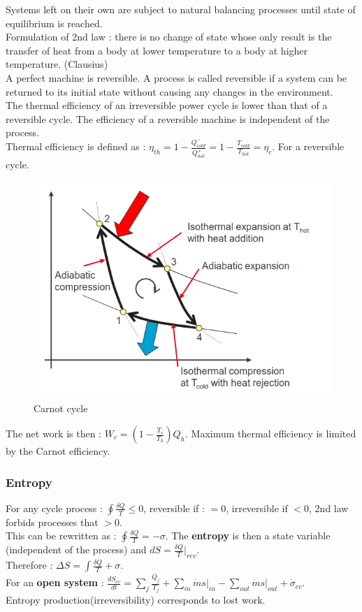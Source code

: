 \documentclass[../main.tex]{subfiles}
\begin{document}
Systems left on their own are subject to natural balancing processes until state of equilibrium is reached. \\
Formulation of 2nd law : there is no change of state whose only result is the transfer of heat from a body at lower temperature to a body at higher temperature. (Clausius)\\
A perfect machine is reversible. A process is called reversible if a system can be returned to its initial state without causing any changes in the environment. \\
\warning The thermal efficiency of an irreversible power cycle is lower than that of a reversible cycle. The efficiency of a reversible machine is independent of the process.\\

Thermal efficiency is defined as : $\eta_{th} = 1-\frac{Q^-_{cold}}{Q^+_{hot}} = 1-\frac{T_{cold}}{T_{hot}} = \eta_c$. \warning For a reversible cycle.\\

\begin{figure}[hbt!]
    \centering
    \includegraphics[width=0.5\linewidth]{IMAGES/HP/Screenshot from 2025-02-27 10-55-55.png}
    \caption{Carnot cycle}
\end{figure}
The net work is then : $W_c = (1-\frac{T_c}{T_h}) Q_h$. Maximum thermal efficiency is limited by the Carnot efficiency.\\

\subsubsection{Entropy}
For any cycle process : $\oint \frac{\delta Q}{T} \leq 0$, reversible if : $=0$, irreversible if $<0$, 2nd law forbids processes that $>0$.\\
This can be rewritten as : $\oint \frac{\delta Q}{T} = -\sigma$. The \textbf{entropy} is then a state variable (independent of the process) and $dS = \frac{\delta Q}{T}\rvert_{rev}$.\\
Therefore : $\Delta S = \int \frac{\delta Q}{T} + \sigma$.\\
For an \textbf{open system} : $\frac{dS_{cv}}{dt} = \sum_j \frac{\dot{Q}_j}{T_j} + \sum_{in} \dot{m}s\rvert_{in} - \sum_{out} \dot{m} s\rvert_{out} + \dot{\sigma}_{cv}$.\\
Entropy production(irreversibility) corresponds to lost work.
\end{document}
